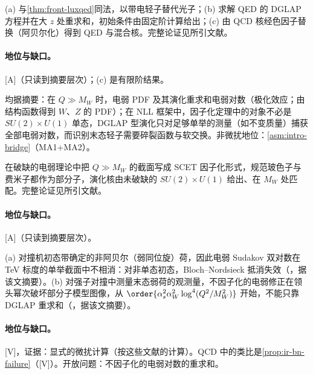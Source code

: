 \begin{proofsketch}
(a) 与\cref{thm:front-luxqed}同法，以带电轻子替代光子；(b) 求解 QED 的 DGLAP 方程并在大 $z$ 处重求和，初始条件由固定阶计算给出；(c) 由 QCD 核经色因子替换（阿贝尔化）得到 QED 与混合核。完整论证见所引文献。
\end{proofsketch}

\paragraph{地位与缺口。}[A]（只读到摘要层次）；(c) 是有限阶结果。

\begin{proposition}\label{prop:front-ew-pdf}
均据摘要：在 $Q\gg M_W$ 时，电弱 PDF 及其演化重求和电弱对数\cite{Bauer:2017isx}（极化效应\cite{Bauer:2018arx}；由结构函数得到 $W$、$Z$ 的 PDF\cite{Fornal:2018znf}）；在 NLL 框架中，因子化定理中的对象不必是 $SU(2)\times U(1)$ 单态，DGLAP 型演化只对足够单举的测量（如不变质量）捕获全部电弱对数，而识别末态轻子需要碎裂函数与软交换\cite{Manohar:2018kfx}。非微扰地位：\cref{asm:intro-bridge}（MA1+MA2）。
\end{proposition}

\begin{proofsketch}
在破缺的电弱理论中把 $Q\gg M_W$ 的截面写成 SCET 因子化形式，规范玻色子与费米子都作为部分子，演化核由未破缺的 $SU(2)\times U(1)$ 给出、在 $M_W$ 处匹配。完整论证见所引文献。
\end{proofsketch}

\paragraph{地位与缺口。}[A]（只读到摘要层次）。

\begin{proposition}\label{prop:front-ew-violation}
(a) 对撞机初态带确定的非阿贝尔（弱同位旋）荷，因此电弱 Sudakov 双对数在 TeV 标度的单举截面中不相消：对非单态初态，Bloch--Nordsieck 抵消失效（\cite{Ciafaloni:2000df}，据该文摘要）。(b) 对强子对撞中测量末态弱荷的观测量，不因子化的电弱修正在领头幂次破坏部分子模型图像，从 $\order{\alpha_s^2\alpha_W^2\log^4(Q^2/M_W^2)}$ 开始，不能只靠 DGLAP 重求和（\cite{Baumgart:2018ntv}，据该文摘要）。
\end{proposition}

\paragraph{地位与缺口。}[V]，证据：显式的微扰计算（按这些文献的计算）。QCD 中的类比是\cref{prop:ir-bn-failure}（[V]）。开放问题：不因子化的电弱对数的重求和。
